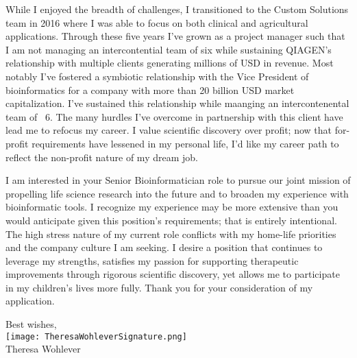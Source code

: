 \documentclass[10pt,letterpaper]{article}
\begin{document}
While I enjoyed the breadth of challenges, I transitioned to the Custom Solutions team in 2016 where I was able to focus on both clinical and agricultural applications. Through these five years I've grown as a project manager such that I am not managing an intercontential team of six while sustaining QIAGEN's relationship with multiple clients generating millions of USD in revenue. Most notably I've fostered a symbiotic relationship with the Vice President of bioinformatics for a company with more than 20 billion USD market capitalization. I've sustained this relationship while maanging an intercontenental team of ~6. The many hurdles I've overcome in partnership with this client have lead me to refocus my career. I value scientific discovery over profit; now that for-profit requirements have lessened in my personal life, I'd like my career path to reflect the non-profit nature of my dream job.


I am interested in your Senior Bioinformatician role to pursue our joint mission of propelling life science research into the future and to broaden my experience with bioinformatic tools. I recognize my experience may be more extensive than you would anticipate given this position's requirements; that is entirely intentional. The high stress nature of my current role conflicts with my home-life priorities and the company culture I am seeking. I desire a position that continues to leverage my strengths, satisfies my passion for supporting therapeutic improvements through rigorous scientific discovery, yet allows me to participate in my children’s lives more fully. Thank you for your consideration of my application.





\hspace*{.6\linewidth} Best wishes, \\
\hspace*{.57\linewidth} \texttt{[image: TheresaWohleverSignature.png]}  {\vspace{-9pt}} \\
\hspace*{.6\linewidth}  Theresa Wohlever
\end{document}
